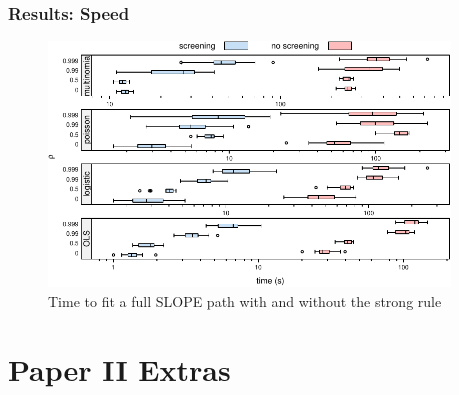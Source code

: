 \documentclass[10pt]{beamer}
\begin{document}
\begin{frame}[c]
  \frametitle{Results: Speed}

  \begin{figure}[htpb]
    \centering
    \includegraphics[width=0.95\textwidth]{figures/paper1-performance.pdf}
    \caption{%
      Time to fit a full SLOPE path with and without the strong rule
    }
  \end{figure}
\end{frame}

\section{Paper II Extras}
\end{document}
